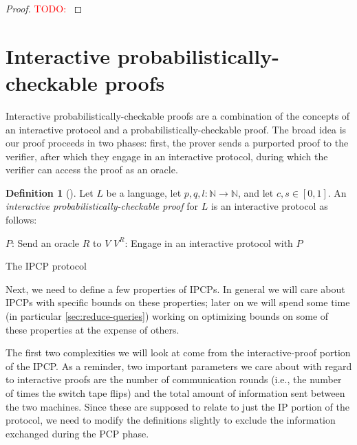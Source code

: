 \documentclass[english,12pt]{reedthesis}
\theoremstyle{plain}
\theoremstyle{definition}
\newtheorem{defn}[defn]{Definition}
\theoremstyle{remark}
\newcommand{\TODO}[1]{\textcolor{red}{TODO: #1}}
\begin{document}
\begin{proof}
  \TODO{}
\end{proof}

\section{Interactive probabilistically-checkable proofs}\label{sec:ipcp}

Interactive probabilistically-checkable proofs are a combination of the concepts
of an interactive protocol and a probabilistically-checkable proof. The broad
idea is our proof proceeds in two phases: first, the prover sends a purported
proof to the verifier, after which they engage in an interactive protocol,
during which the verifier can access the proof as an oracle.

\begin{defn}[{\cite[]{KR08}}]\label{def:ipcp}
  Let $L$ be a language, let $p, q, l\colon \mathbb{N} \rightarrow \mathbb{N}$, and let $c, s \in [0, 1]$. An
  \emph{interactive probabilistically-checkable proof} for $L$ is an interactive
  protocol as follows:

  \begin{algorithm}[H]
    $P$: Send an oracle $R$ to $V$\;
    $V^{R}$: Engage in an interactive protocol with $P$\;
    \caption{The IPCP protocol}\label{alg:ipcp-protocol}
  \end{algorithm}
\end{defn}

Next, we need to define a few properties of IPCPs. In general we will care about
IPCPs with specific bounds on these properties; later on we will spend some time
(in particular \cref{sec:reduce-queries}) working on optimizing bounds on some
of these properties at the expense of others.

The first two complexities we will look at come from the interactive-proof
portion of the IPCP\@. As a reminder, two important parameters we care about
with regard to interactive proofs are the number of communication rounds (i.e.,
the number of times the switch tape flips) and the total amount of information
sent between the two machines. Since these are supposed to relate to just the IP
portion of the protocol, we need to modify the definitions slightly to exclude
the information exchanged during the PCP phase.
\end{document}
